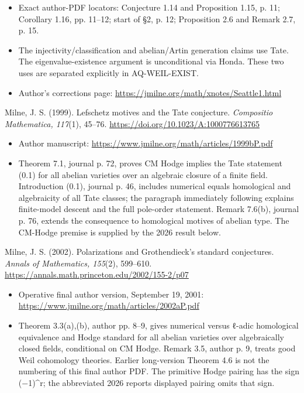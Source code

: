 \documentclass[11pt,a4paper]{article}
\providecommand{\tightlist}{\setlength{\itemsep}{0pt}\setlength{\parskip}{0pt}}
\theoremstyle{definition}\newtheorem{definition}[theorem]{Definition}
\theoremstyle{remark}\newtheorem{remark}[theorem]{Remark}
\begin{document}
\begin{itemize}
\tightlist
\item
  Exact author-PDF locators: Conjecture 1.14 and Proposition 1.15, p.
  11; Corollary 1.16, pp. 11--12; start of §2, p. 12; Proposition 2.6
  and Remark 2.7, p. 15.
\item
  The injectivity/classification and abelian/Artin generation claims use
  Tate. The eigenvalue-existence argument is unconditional via Honda.
  These two uses are separated explicitly in AQ-WEIL-EXIST.
\item
  Author's corrections page:
  \url{https://jmilne.org/math/xnotes/Seattle1.html}
\end{itemize}

Milne, J. S. (1999). Lefschetz motives and the Tate conjecture.
\emph{Compositio Mathematica, 117}(1), 45--76.
\url{https://doi.org/10.1023/A:1000776613765}

\begin{itemize}
\tightlist
\item
  Author manuscript:
  \url{https://www.jmilne.org/math/articles/1999bP.pdf}
\item
  Theorem 7.1, journal p. 72, proves CM Hodge implies the Tate statement
  (0.1) for all abelian varieties over an algebraic closure of a finite
  field. Introduction (0.1), journal p. 46, includes numerical equals
  homological and algebraicity of all Tate classes; the paragraph
  immediately following explains finite-model descent and the full
  pole-order statement. Remark 7.6(b), journal p. 76, extends the
  consequence to homological motives of abelian type. The CM-Hodge
  premise is supplied by the 2026 result below.
\end{itemize}

Milne, J. S. (2002). Polarizations and Grothendieck's standard
conjectures. \emph{Annals of Mathematics, 155}(2), 599--610.
\url{https://annals.math.princeton.edu/2002/155-2/p07}

\begin{itemize}
\tightlist
\item
  Operative final author version, September 19, 2001:
  \url{https://www.jmilne.org/math/articles/2002aP.pdf}
\item
  Theorem 3.3(a),(b), author pp. 8--9, gives numerical versus ℓ-adic
  homological equivalence and Hodge standard for all abelian varieties
  over algebraically closed fields, conditional on CM Hodge. Remark 3.5,
  author p. 9, treats good Weil cohomology theories. Earlier
  long-version Theorem 4.6 is not the numbering of this final author
  PDF. The primitive Hodge pairing has the sign (−1)\^{}r; the
  abbreviated 2026 report\textquotesingle s displayed pairing omits that
  sign.
\end{itemize}
\end{document}
